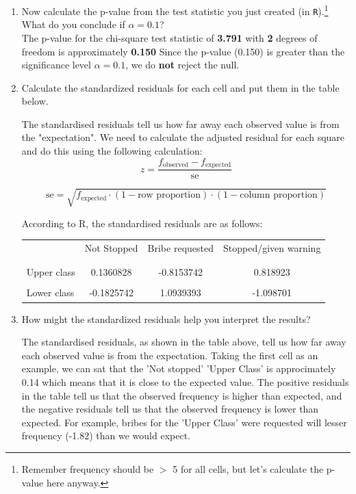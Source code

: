 \documentclass[12pt,letterpaper]{article}
\begin{document}
\begin{enumerate}
	\vspace{7cm}
	\item [(b)]
	Now calculate the p-value from the test statistic you just created (in \texttt{R}).\footnote{Remember frequency should be $>$ 5 for all cells, but let's calculate the p-value here anyway.}  What do you conclude if $\alpha = 0.1$?\\

The p-value for the chi-square test statistic of \textbf{3.791} with \textbf{2} degrees of freedom is approximately \textbf{0.150}
Since the p-value (0.150) is greater than the significance level \textbf{$\alpha = 0.1$}, we do \textbf{not} reject the null.

	\item [(c)] Calculate the standardized residuals for each cell and put them in the table below.
	\vspace{1cm}

The standardised residuals tell us how far away each observed value is from the "expectation". We need to calculate the adjusted residual for each square and do this using the following calculation: 
\[
z = \frac{f_{\text{observed}} - f_{\text{expected}}}{\text{se}}
\]

\[
\text{se} = \sqrt{f_{\text{expected}} \cdot (1 - \text{row proportion}) \cdot (1 - \text{column proportion})}
\]

According to R, the standardised residuals are as follows: 

\begin{table}[h]
	\centering
	\begin{tabular}{l | c c c }
		& Not Stopped & Bribe requested & Stopped/given warning \\
		\\[-1.8ex] 
		\hline \\[-1.8ex]
		Upper class  & 0.1360828 & -0.8153742 & 0.818923\\
		\\
		Lower class & -0.1825742 & 1.0939393 & -1.098701 \\
		
	\end{tabular}
\end{table}
	
	\item [(d)] How might the standardized residuals help you interpret the results?  


The standardised residuals, as shown in the table above, tell us how far away each observed value is from the expectation. Taking the first cell as an example, we can sat that the 'Not stopped' 'Upper Class' is approcimately 0.14 which means that it is close to the expected value. The positive residuals in the table tell us that the observed frequency is higher than expected, and the negative residuals tell us that the observed frequency is lower than expected. For example, bribes for the 'Upper Class' were requested will lesser frequency (-1.82) than we would expect.\\


\end{enumerate}
\end{document}
